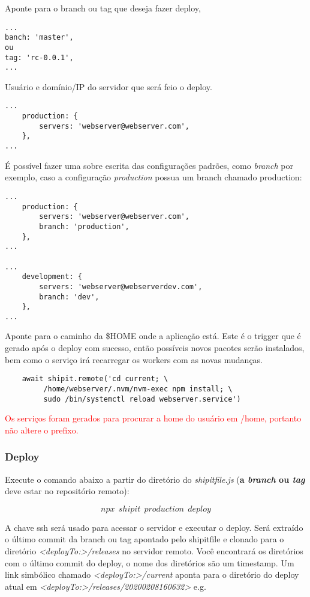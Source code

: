 Aponte para o branch ou tag que deseja fazer deploy,
\begin{verbatim}
...
banch: 'master',
ou
tag: 'rc-0.0.1',
...
\end{verbatim}

Usuário e domínio/IP do servidor que será feio o deploy.
\begin{verbatim}
...
    production: {
        servers: 'webserver@webserver.com',
    },
...
\end{verbatim}

É possível fazer uma sobre escrita das configurações padrões,
como \emph{branch} por exemplo, caso a configuração \emph{production}
possua um branch chamado production:
\begin{verbatim}
...
    production: {
        servers: 'webserver@webserver.com',
        branch: 'production',
    },
...

...
    development: {
        servers: 'webserver@webserverdev.com',
        branch: 'dev',
    },
...
\end{verbatim}

Aponte para o caminho da \$HOME onde a aplicação está. Este é o
trigger que é gerado após o deploy com sucesso, então possíveis novos
pacotes serão instalados, bem como o serviço irá recarregar os workers
com as novas mudanças.

\begin{verbatim}
    await shipit.remote('cd current; \
         /home/webserver/.nvm/nvm-exec npm install; \
         sudo /bin/systemctl reload webserver.service')
\end{verbatim}

\textcolor{red}{Os serviços foram gerados para procurar a home do
  usuário em /home, portanto não altere o prefixo.}

\subsubsection{Deploy}
Execute o comando abaixo a partir do diretório do
\emph{shipitfile.js} (\textbf{a \emph{branch} ou \emph{tag}} deve
estar no repositório remoto):

$$npx\ \ shipit\ \ production\ \ deploy$$

A chave ssh será usado para acessar o servidor e executar o
deploy. Será extraído o último commit da branch ou tag apontado pelo
shipitfile e clonado para o diretório
\textit{<\textit{deployTo:}>/releases} no servidor remoto. Você
encontrará os diretórios com o último commit do deploy, o nome dos
diretórios são um timestamp. Um link simbólico chamado
\textit{<deployTo:>/current} aponta para o diretório do deploy atual
em \textit{<deployTo:>/releases/20200208160632>} e.g. 


